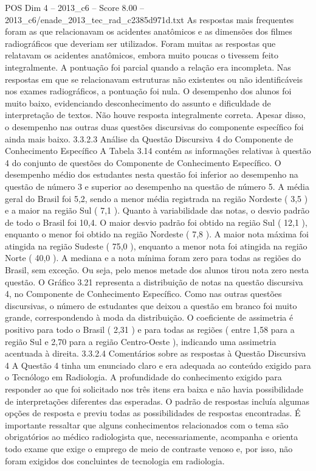 \begin{textsample}{POS Dim 4 – 2013\_c6 – Score 8.00 – 2013\_c6/enade\_2013\_tec\_rad\_c2385d971d.txt}
As respostas mais frequentes foram as que relacionavam os acidentes anatômicos e as dimensões dos filmes radiográficos que deveriam ser utilizados.
Foram muitas as respostas que relatavam os acidentes anatômicos, embora muito poucas o tivessem feito integralmente.
A pontuação foi parcial quando a relação era incompleta.
Nas respostas em que se relacionavam estruturas não existentes ou não identificáveis nos exames radiográficos, a pontuação foi nula.
O desempenho dos alunos foi muito baixo, evidenciando desconhecimento do assunto e dificuldade de interpretação de textos.
Não houve resposta integralmente correta.
Apesar disso, o desempenho nas outras duas questões discursivas do componente específico foi ainda mais baixo. 3.3.2.3 Análise da Questão Discursiva 4 do Componente de Conhecimento Específico A Tabela 3.14 contém as informações relativas à questão 4 do conjunto de questões do Componente de Conhecimento Específico.
O desempenho médio dos estudantes nesta questão foi inferior ao desempenho na questão de número 3 e superior ao desempenho na questão de número 5.
A média geral do Brasil foi 5,2, sendo a menor média registrada na região Nordeste ( 3,5 ) e a maior na região Sul ( 7,1 ).
Quanto à variabilidade das notas, o desvio padrão de todo o Brasil foi 10,4.
O maior desvio padrão foi obtido na região Sul ( 12,1 ), enquanto o menor foi obtido na região Nordeste ( 7,8 ).
A maior nota máxima foi atingida na região Sudeste ( 75,0 ), enquanto a menor nota foi atingida na região Norte ( 40,0 ).
A mediana e a nota mínima foram zero para todas as regiões do Brasil, sem exceção.
Ou seja, pelo menos metade dos alunos tirou nota zero nesta questão.
O Gráfico 3.21 representa a distribuição de notas na questão discursiva 4, no Componente de Conhecimento Específico.
Como nas outras questões discursivas, o número de estudantes que deixou a questão em branco foi muito grande, correspondendo à moda da distribuição.
O coeficiente de assimetria é positivo para todo o Brasil ( 2,31 ) e para todas as regiões ( entre 1,58 para a região Sul e 2,70 para a região Centro-Oeste ), indicando uma assimetria acentuada à direita. 3.3.2.4 Comentários sobre as respostas à Questão Discursiva 4 A Questão 4 tinha um enunciado claro e era adequada ao conteúdo exigido para o Tecnólogo em Radiologia.
A profundidade do conhecimento exigido para responder ao que foi solicitado nos três itens era baixa e não havia possibilidade de interpretações diferentes das esperadas.
O padrão de respostas incluía algumas opções de resposta e previu todas as possibilidades de respostas encontradas.
É importante ressaltar que alguns conhecimentos relacionados com o tema são obrigatórios ao médico radiologista que, necessariamente, acompanha e orienta todo exame que exige o emprego de meio de contraste venoso e, por isso, não foram exigidos dos concluintes de tecnologia em radiologia.

\end{textsample}
